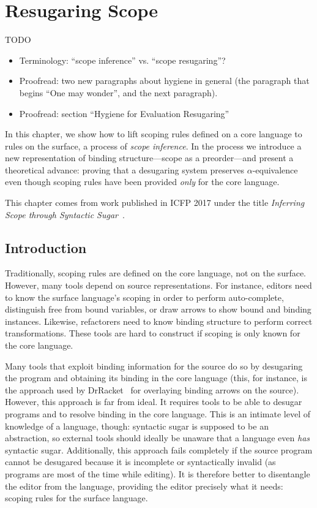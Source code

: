 \chapter{Resugaring Scope}\label{chap:resugar-scope}

TODO
\begin{itemize}
\item Terminology: ``scope inference'' vs. ``scope resugaring''?
\item Proofread: two new paragraphs about hygiene in general
  (the paragraph that begins ``One may wonder'', and the next
  paragraph).
\item Proofread: section ``Hygiene for Evaluation Resugaring''
\end{itemize}

In this chapter, we show how to lift scoping rules defined on a core
language to rules on the surface, a process of \emph{scope inference}.
In the process we introduce a new representation of binding
structure---scope as a preorder---and present a theoretical advance:
proving that a desugaring system preserves $\alpha$-equivalence even
though scoping rules have been provided \emph{only} for the core
language.

This chapter comes from work published in ICFP 2017 under the
title \emph{Inferring Scope through Syntactic Sugar}~\cite{pombrio-scope}.

\section{Introduction}

Traditionally,
scoping rules are defined on the core language, not on the
surface. However, many tools depend on source representations. For
instance, editors need to know the surface language's scoping in order
to perform auto-complete, distinguish free from bound variables, or draw
arrows to show bound and binding instances. Likewise, refactorers need
to know binding structure to perform correct transformations.
These tools are hard to construct if scoping is only known
for the core language.

Many tools that exploit binding information for the source
do so by desugaring the program and obtaining its binding in the core
language (this, for instance, is the approach used by
DrRacket~\cite{drscheme} for overlaying binding arrows on the
source).
However, this approach is far from ideal. It requires tools to be able
to desugar programs and to resolve binding in the core
language. This is an intimate level of knowledge of a language, though:
syntactic sugar is supposed to be an abstraction, so external tools
should ideally be unaware that a language even \emph{has} syntactic
sugar. Additionally, this approach fails completely if the source
program cannot be desugared because it is incomplete or syntactically
invalid (as programs are most of the time while editing). It is
therefore better to disentangle the editor from the language,
providing the editor precisely what it needs: scoping rules for the
surface language.

